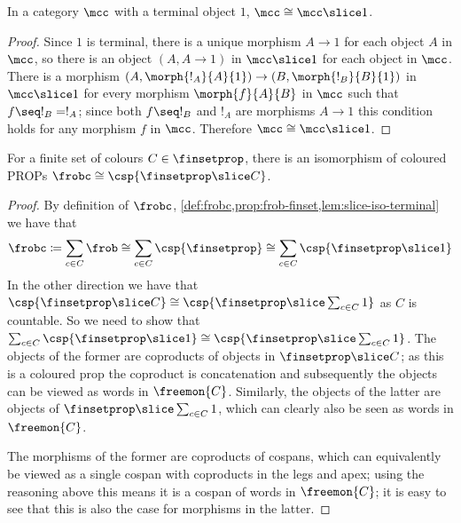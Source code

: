 \begin{lemma}
    \label{lem:slice-iso-terminal}
    In a category \(\mcc\) with a terminal object \(1\),
    \(\mcc \cong \mcc \slice 1\).
\end{lemma}
\begin{proof}
    Since \(1\) is terminal, there is a unique morphism \(A \to 1\) for each
    object \(A\) in \(\mcc\), so there is an object \((A, A \to 1)\) in
    \(\mcc \slice 1\) for each object in \(\mcc\).
    There is a morphism \((A, \morph{!_A}{A}{1}) \to (B, \morph{!_B}{B}{1})\) in
    \(\mcc \slice 1\) for every morphism \(\morph{f}{A}{B}\) in \(\mcc\) such
    that \(f \seq !_B = !_A\); since both \(f \seq !_B\) and \(!_A\) are
    morphisms \(A \to 1\) this condition holds for any morphism \(f\) in
    \(\mcc\).
    Therefore \(\mcc \cong \mcc \slice 1\).
\end{proof}

\begin{theorem}
    \label{thm:frobc-iso-finset-slice-c}
    For a finite set of colours \(C \in \finsetprop\), there is an isomorphism
    of coloured PROPs \(\frobc \cong \csp{\finsetprop \slice C}\).
\end{theorem}
\begin{proof}
    By definition of \(\frobc\),
    \cref{def:frobc,prop:frob-finset,lem:slice-iso-terminal}
    we have that \[
        \frobc
        \coloneqq
        \sum_{c \in C}\frob
        \cong
        \sum_{c \in C}\csp{\finsetprop}
        \cong
        \sum_{c \in C}\csp{\finsetprop \slice 1}
    \]
    In the other direction we have that \(
        \csp{\finsetprop \slice C}
        \cong
        \csp{\finsetprop \slice \sum_{c \in C} 1}
    \) as \(C\) is countable.
    So we need to show that \(
        \sum_{c \in C}\csp{\finsetprop \slice 1}
        \cong
        \csp{\finsetprop \slice \sum_{c \in C} 1}
    \).
    The objects of the former are coproducts of objects in
    \(\finsetprop \slice C\); as this is a coloured prop the coproduct is
    concatenation and subsequently the objects can be viewed as words in
    \(\freemon{C}\).
    Similarly, the objects of the latter are objects of
    \(\finsetprop \slice \sum_{c \in C} 1\), which can clearly also be
    seen as words in \(\freemon{C}\).

    The morphisms of the former are coproducts of cospans, which can
    equivalently be viewed as a single cospan with coproducts in the legs and
    apex; using the reasoning above this means it is a cospan of words in
    \(\freemon{C}\); it is easy to see that this is also the case for morphisms
    in the latter.
\end{proof}

